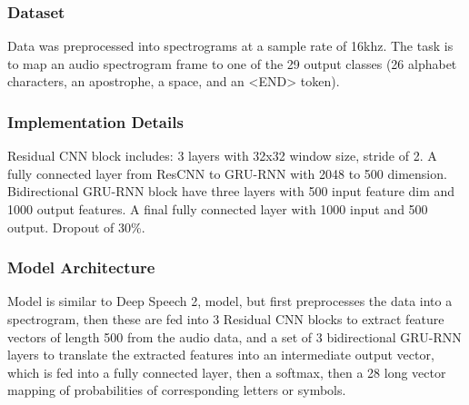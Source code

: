 \subsubsection{Dataset}

Data was preprocessed into spectrograms at a sample rate of 16khz. The task is to map an audio spectrogram frame to one of the 29 output classes (26 alphabet characters, an apostrophe, a space, and an <END> token). 


\subsubsection{Implementation Details}

Residual CNN block includes: 3 layers with 32x32 window size, stride of 2. A fully connected layer from ResCNN to GRU-RNN with 2048 to 500 dimension. Bidirectional GRU-RNN block have three layers with 500 input feature dim and 1000 output features. A final fully connected layer with 1000 input and 500 output. Dropout of 30\%.

\subsubsection{Model Architecture}

Model is similar to Deep Speech 2, model, but first preprocesses the data into a spectrogram, then these are fed into 3 Residual CNN blocks to extract feature vectors of length 500 from the audio data, and a set of 3 bidirectional GRU-RNN layers to translate the extracted features into an intermediate output vector, which is fed into a fully connected layer, then a softmax, then a 28 long vector mapping of probabilities of corresponding letters or symbols.



